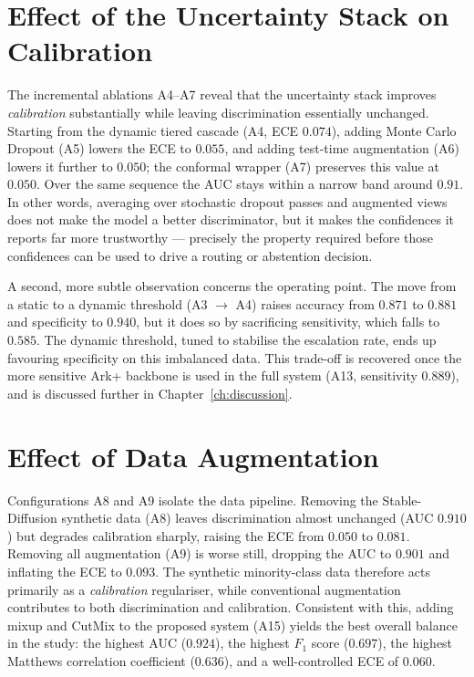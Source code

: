 

\section{Effect of the Uncertainty Stack on Calibration}
The incremental ablations A4--A7 reveal that the uncertainty stack improves \emph{calibration} substantially while leaving discrimination essentially unchanged. Starting from the dynamic tiered cascade (A4, ECE $0.074$), adding Monte Carlo Dropout (A5) lowers the ECE to $0.055$, and adding test-time augmentation (A6) lowers it further to $0.050$; the conformal wrapper (A7) preserves this value at $0.050$. Over the same sequence the AUC stays within a narrow band around $0.91$. In other words, averaging over stochastic dropout passes and augmented views does not make the model a better discriminator, but it makes the confidences it reports far more trustworthy --- precisely the property required before those confidences can be used to drive a routing or abstention decision.

A second, more subtle observation concerns the operating point. The move from a static to a dynamic threshold (A3 $\rightarrow$ A4) raises accuracy from $0.871$ to $0.881$ and specificity to $0.940$, but it does so by sacrificing sensitivity, which falls to $0.585$. The dynamic threshold, tuned to stabilise the escalation rate, ends up favouring specificity on this imbalanced data. This trade-off is recovered once the more sensitive Ark+ backbone is used in the full system (A13, sensitivity $0.889$), and is discussed further in Chapter~\ref{ch:discussion}.

\section{Effect of Data Augmentation}
Configurations A8 and A9 isolate the data pipeline. Removing the Stable-Diffusion synthetic data (A8) leaves discrimination almost unchanged (AUC $0.910$) but degrades calibration sharply, raising the ECE from $0.050$ to $0.081$. Removing all augmentation (A9) is worse still, dropping the AUC to $0.901$ and inflating the ECE to $0.093$. The synthetic minority-class data therefore acts primarily as a \emph{calibration} regulariser, while conventional augmentation contributes to both discrimination and calibration. Consistent with this, adding mixup and CutMix to the proposed system (A15) yields the best overall balance in the study: the highest AUC ($0.924$), the highest $F_1$ score ($0.697$), the highest Matthews correlation coefficient ($0.636$), and a well-controlled ECE of $0.060$.

